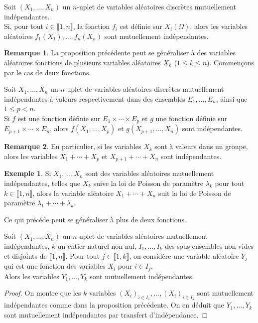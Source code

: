 \documentclass[french]{article}
\theoremstyle{plain}
\theoremstyle{definition}
\newtheorem*{ex}{Exemple}
\newtheorem*{rmq}{Remarque}
\theoremstyle{remark}
\begin{document}
\begin{prop}%
	Soit $(X_1,\ldots,X_n)$ un $n$-uplet de variables aléatoires discrètes mutuellement indépendantes.\\
	Si, pour tout $i\in\llbracket1,n\rrbracket$, la fonction $f_i$ est définie sur $X_i(\Omega)$, alors les variables aléatoires $f_1(X_1),\ldots,f_n(X_n)$ sont mutuellement indépendantes.
\end{prop}

\begin{rmq}
	La proposition précédente peut se généraliser à des variables aléatoires fonctions de plusieurs variables aléatoires $X_k$ ($1\leqslant k\leqslant n$). Commençons par le cas de deux fonctions.
\end{rmq}

\begin{prop}%
	Soit $X_1,\ldots,X_n$ un $n$-uplet de variables aléatoires discrètes mutuellement indépendantes à valeurs respectivement dans des ensembles $E_1,\ldots,E_n$, ainsi que $1\leqslant p<n$.\\
	Si $f$ est une fonction définie sur $E_1\times\cdots\times E_p$ et $g$ une fonction définie sur $E_{p+1}\times\cdots\times E_n$, alors $f(X_1,\ldots,X_p)$ et $g(X_{p+1},\ldots,X_n)$ sont indépendantes.
\end{prop}

\begin{rmq}
	En particulier, si les variables $X_k$ sont à valeurs dans un groupe, alors les variables $X_1+\cdots+X_p$ et $X_{p+1}+\cdots+X_n$ sont indépendantes.
\end{rmq}

\begin{ex}
	Si $X_1,\ldots,X_n$ sont des variables aléatoires mutuellement indépendantes, telles que $X_k$ suive la loi de Poisson de paramètre $\lambda_k$ pour tout $k\in\llbracket1,n\rrbracket$, alors la variable aléatoire $X_1+\cdots+X_n$ suit la loi de Poisson de paramètre $\lambda_1+\cdots+\lambda_k$.
\end{ex}

Ce qui précède peut se généraliser à plus de deux fonctions.

\begin{prop}%
	Soit $(X_1,\ldots,X_n)$ un $n$-uplet de variables aléatoires mutuellement indépendantes, $k$ un entier naturel non nul, $I_1,\ldots,I_k$ des sous-ensembles non vides et disjoints de $\llbracket1,n\rrbracket$. Pour tout $j\in\llbracket1,k\rrbracket$, on considère une variable aléatoire $Y_j$ qui est une fonction des variables $X_i$ pour $i\in I_j$. \\
	Alors les variables $Y_1,\ldots,Y_k$ sont mutuellement indépendantes.
\end{prop}
\begin{proof}
	On montre que les $k$ variables $(X_i)_{i\in I_1},\ldots,(X_i)_{i\in I_k}$ sont mutuellement indépendantes comme dans la proposition précédente. On en déduit que $Y_1,\ldots,Y_k$ sont mutuellement indépendantes par transfert d'indépendance.
\end{proof}
\end{document}

